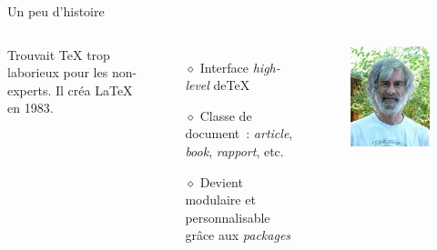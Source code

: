 \begin{frame}{Un peu d'histoire}
    \begin{columns}
        Trouvait \TeX\; trop laborieux pour les non-experts.
        Il créa \LaTeX\; en 1983.
        \vspace{0.5cm}
        \begin{itemize}
            \item[$\diamond$] Interface \textit{high-level} de\;\TeX
            \item[$\diamond$] Classe de document~: \textit{article}, \textit{book}, \textit{rapport}, etc.
            \item[$\diamond$] Devient modulaire et personnalisable grâce aux \textit{packages}
        \end{itemize}
        \begin{figure}
           \centering
            \includegraphics[scale=0.45]{./figures/Leslie_Lamport.jpg}
            \caption{\cite{LAMPORT}}
            \label{fig: LESLIE}
        \end{figure}
    \end{columns}
\end{frame}
